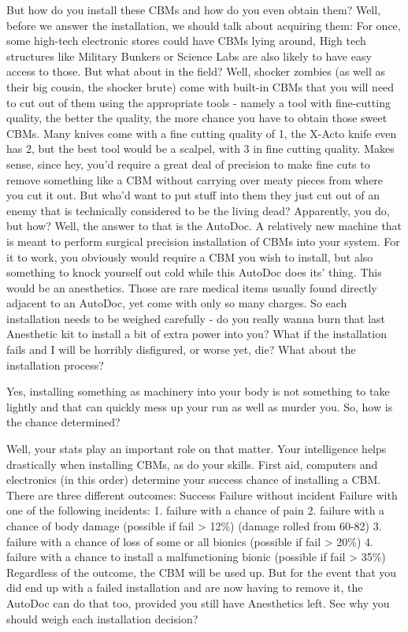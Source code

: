 \documentclass[11pt]{report}
\begin{document}
But how do you install these CBMs and how do you even obtain them? Well, before we answer the installation, we should talk about acquiring them: For once, some high-tech electronic stores could have CBMs lying around, High tech structures like Military Bunkers or Science Labs are also likely to have easy access to those. But what about in the field? Well, shocker zombies (as well as their big cousin, the shocker brute) come with built-in CBMs that you will need to cut out of them using the appropriate tools - namely a tool with fine-cutting quality, the better the quality, the more chance you have to obtain those sweet CBMs. Many knives come with a fine cutting quality of 1, the X-Acto knife even has 2, but the best tool would be a scalpel, with 3 in fine cutting quality. Makes sense, since hey, you'd require a great deal of precision to make fine cuts to remove something like a CBM without carrying over meaty pieces from where you cut it out. But who'd want to put stuff into them they just cut out of an enemy that is technically considered to be the living dead? Apparently, you do, but how?
Well, the answer to that is the AutoDoc. A relatively new machine that is meant to perform surgical precision installation of CBMs into your system. For it to work, you obviously would require a CBM you wish to install, but also something to knock yourself out cold while this AutoDoc does its' thing. This would be an anesthetics. Those are rare medical items usually found directly adjacent to an AutoDoc, yet come with only so many charges. So each installation needs to be weighed carefully - do you really wanna burn that last Anesthetic kit to install a bit of extra power into you? What if the installation fails and I will be horribly disfigured, or worse yet, die? What about the installation process?

Yes, installing something as machinery into your body is not something to take lightly and that can quickly mess up your run as well as murder you. So, how is the chance determined?

Well, your stats play an important role on that matter. Your intelligence helps drastically when installing CBMs, as do your skills. First aid, computers and electronics (in this order) determine your success chance of installing a CBM. There are three different outcomes:
Success
Failure without incident
Failure with one of the following incidents:
    1. failure with a chance of pain
    2. failure with a chance of body damage (possible if fail > 12\%) (damage rolled from 60-82)
    3. failure with a chance of loss of some or all bionics (possible if fail > 20\%)
    4. failure with a chance to install a malfunctioning bionic (possible if fail > 35\%)
Regardless of the outcome, the CBM will be used up. But for the event that you did end up with a failed installation and are now having to remove it, the AutoDoc can do that too, provided you still have Anesthetics left. See why you should weigh each installation decision?
\end{document}
